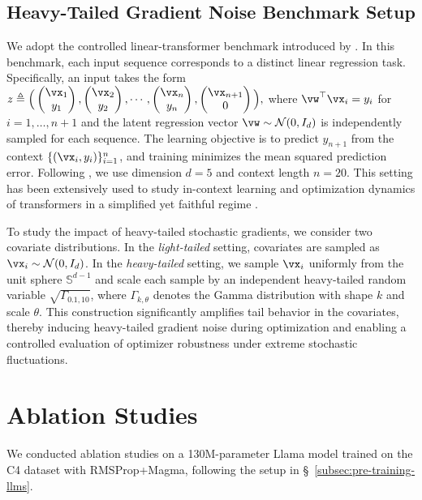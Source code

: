 \documentclass[11pt, a4paper, twocolumn, copyright, goog]{google}
\theoremstyle{plain}
\theoremstyle{definition}
\theoremstyle{remark}
\begin{document}
\subsection{Heavy-Tailed Gradient Noise Benchmark Setup} \label{appx:ahn_linear_benchmark}
We adopt the controlled linear-transformer benchmark introduced by \citet{ahn2023linear}.
In this benchmark, each input sequence corresponds to a distinct linear regression task.
Specifically, an input takes the form $z \triangleq \Big( \begin{pmatrix} \vx_1 \\ y_1 \end{pmatrix}, \begin{pmatrix} \vx_2 \\ y_2 \end{pmatrix}, \cdots, \begin{pmatrix} \vx_n \\ y_n \end{pmatrix}, \begin{pmatrix} \vx_{n+1} \\ 0 \end{pmatrix} \Big),$ where $\vw^\top \vx_i = y_i$ for $i=1,\dots,n+1$ and the latent regression vector $\vw \sim \mathcal N(0,I_d)$ is independently sampled for each sequence.
The learning objective is to predict $y_{n+1}$ from the context $\{(\vx_i,y_i)\}_{i=1}^n$, and training minimizes the mean squared prediction error.
Following \citet{ahn2023linear}, we use dimension $d=5$ and context length $n=20$. This setting has been extensively used to study in-context learning and optimization dynamics of transformers in a simplified yet faithful regime \citep{akyurek2022learning,von2023transformers,garg2022can}.

To study the impact of heavy-tailed stochastic gradients, we consider two covariate distributions. In the \emph{light-tailed} setting, covariates are sampled as $\vx_i \sim \mathcal N(0,I_d)$. In the \emph{heavy-tailed} setting, we sample $\vx_i$ uniformly from the unit sphere $\mathbb S^{d-1}$ and scale each sample by an independent heavy-tailed random variable $\sqrt{\Gamma_{0.1,10}}$, where $\Gamma_{k,\theta}$ denotes the Gamma distribution with shape $k$ and scale $\theta$. 
This construction significantly amplifies tail behavior in the covariates, thereby inducing heavy-tailed gradient noise during optimization and enabling a controlled evaluation of optimizer robustness under extreme stochastic fluctuations.

\section{Ablation Studies} \label{appx:ablation_studies}
We conducted ablation studies on a 130M-parameter Llama model trained on the C4 dataset with RMSProp+Magma, following the setup in \S~\ref{subsec:pre-training-llms}.
\end{document}
